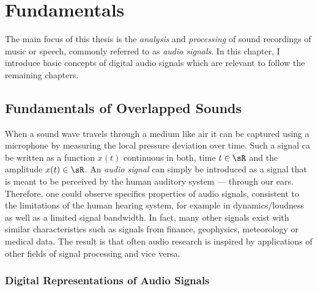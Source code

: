 \hypertarget{fundamentals}{%
\chapter{Fundamentals}\label{fundamentals}}

The main focus of this thesis is the \emph{analysis} and \emph{processing} of sound recordings of music or speech, commonly referred to as \emph{audio signals}.
In this chapter, I introduce basic concepts of digital audio signals which are relevant to follow the remaining chapters.

\hypertarget{Fundamentals of Overlapped Sounds}{%
\section{Fundamentals of Overlapped Sounds}\label{specifics-of-audio-signals}}

When a sound wave travels through a medium like air it can be captured using a microphone by measuring the local pressure deviation over time.
Such a signal ca be written as a function \(x(t)\) continuous in both, time \(t \in \sR\) and the amplitude \(x(t) \in \sR\).
An \emph{audio signal} can simply be introduced as a signal that is meant to be perceived by the human auditory system --- through our ears.
Therefore, one could observe specifics properties of audio signals, consistent to the limitations of the human hearing system, for example in dynamics/loudness as well as a limited signal bandwidth.
In fact, many other signals exist with similar characteristics such as signals from finance, geophysics, meteorology or medical data.
The result is that often audio research is inspired by applications of other fields of signal processing and vice versa.

\hypertarget{digital-representations-of-audio-signals}{%
\subsection{Digital Representations of Audio
Signals}\label{digital-representations-of-audio-signals}}

